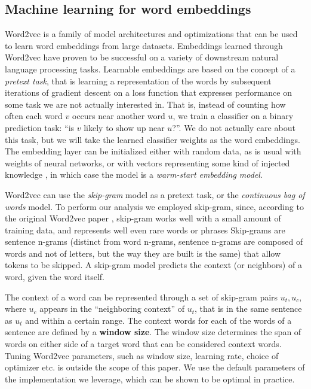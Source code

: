 \subsection{Machine learning for word embeddings}

Word2vec \cite{mikolov_efficient_2013} is a family of model architectures and optimizations that can be used to learn word embeddings from large datasets. 
Embeddings learned through Word2vec have proven to be successful on a variety of downstream natural language processing tasks.
Learnable embeddings are based on the concept of a \emph{pretext task}, that is learning a representation of the words by subsequent iterations of gradient descent on a loss function that expresses performance on some task we are not actually interested in.
That is, instead of counting how often each word $v$ occurs near another word $u$, we train a classifier on a binary prediction task: ``is $v$ likely to show up near $u$?''.
We do not actually care about this task, but we will take the learned classifier weights as the word embeddings. The embedding layer can be initialized either with random data, as is usual with weights of neural networks, or with vectors representing some kind of injected knowledge \cite{bojanowski_enriching_2016}, in which case the model is a \emph{warm-start embedding model}.

Word2vec can use the \textit{skip-gram} model as a pretext task, or the \textit{continuous bag of words} model.
To perform our analysis we employed skip-gram, since, according to the original Word2vec paper \cite{mikolov_efficient_2013}, skip-gram works well with a small amount of training data, and represents well even rare words or phrases
Skip-grams are sentence n-grams (distinct from word n-grams, sentence n-grams are composed of words and not of letters, but the way they are built is the same) that allow tokens to be skipped. 
A skip-gram model predicts the context (or neighbors) of a word, given the word itself.

The context of a word can be represented through a set of skip-gram pairs $u_t, u_c$, where $u_c$ appears in the ``neighboring context'' of $u_t$, that is in the same sentence as $u_t$ and within a certain range.
The context words for each of the words of a sentence are defined by a \textbf{window size}.
The window size determines the span of words on either side of a target word that can be considered context words.
Tuning Word2vec parameters, such as window size, learning rate, choice of optimizer etc. is outside the scope of this paper.
We use the default parameters of the implementation we leverage, which can be shown to be optimal in practice.

